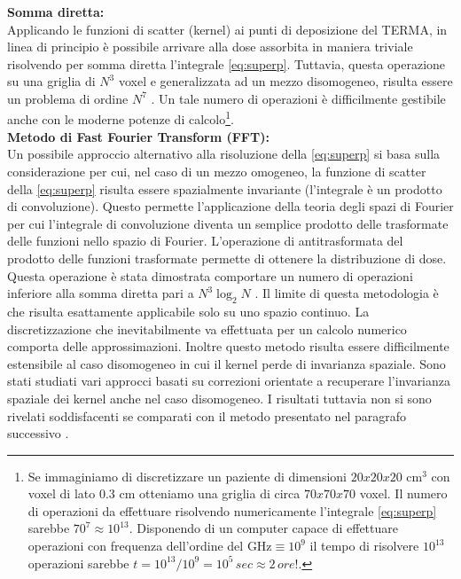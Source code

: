 {\textbf{Somma diretta:\\}
Applicando le funzioni di scatter (kernel) ai punti di deposizione del TERMA, in linea di principio è possibile arrivare alla dose assorbita in maniera triviale risolvendo per somma diretta l'integrale \eqref{eq:superp}. Tuttavia, questa operazione su una griglia di $N^3$ voxel e generalizzata ad un mezzo disomogeneo, risulta essere un problema  di ordine $N^7$ \cite{Ahnesjo1989}. Un tale numero di operazioni è difficilmente gestibile anche con le moderne potenze di calcolo\footnote{Se immaginiamo di discretizzare un paziente di dimensioni $20x20x20$ cm$^3$ con voxel di lato $0.3$ cm otteniamo una griglia di circa $70x70x70$ voxel. Il numero di operazioni da effettuare risolvendo numericamente l'integrale \eqref{eq:superp} sarebbe $70^7\approx 10^{13}$. Disponendo di un computer capace di effettuare operazioni con frequenza dell'ordine del GHz$\equiv 10^9$ il tempo di risolvere $10^{13}$ operazioni sarebbe $t=10^{13}/10^9=10^5\,sec\approx 2\, ore!$.}. \\

\textbf{Metodo di Fast Fourier Transform (FFT):\\}
Un possibile approccio alternativo alla risoluzione della \eqref{eq:superp} si basa sulla considerazione per cui, nel caso di un mezzo omogeneo, la funzione di scatter della \eqref{eq:superp} risulta essere spazialmente invariante (l'integrale è un prodotto di convoluzione). Questo permette l'applicazione della teoria degli spazi di Fourier per cui l'integrale di convoluzione  diventa un semplice prodotto delle trasformate delle funzioni nello spazio di Fourier. L'operazione di antitrasformata del prodotto delle funzioni trasformate permette di ottenere la distribuzione di dose. Questa operazione è stata dimostrata comportare un numero di operazioni inferiore alla somma diretta pari a $N^3\log_2 N$ \cite{Wong1996}. Il limite di questa metodologia è che risulta esattamente applicabile solo su uno spazio continuo. La discretizzazione che inevitabilmente va effettuata per un calcolo numerico comporta delle approssimazioni. Inoltre questo metodo risulta essere difficilmente estensibile al caso disomogeneo in cui il kernel perde di invarianza spaziale. Sono stati studiati vari approcci basati su correzioni orientate a recuperare l'invarianza spaziale dei kernel anche nel caso disomogeneo. I risultati tuttavia non si sono rivelati soddisfacenti se comparati con il metodo presentato nel paragrafo successivo \cite{Wong1996}.\\

}
